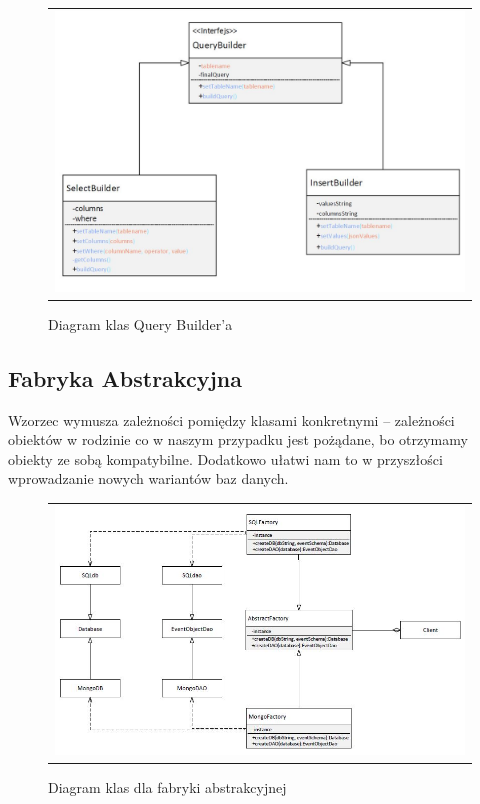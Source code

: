 \documentclass{sprawozdanie-agh}
\begin{document}
	\begin{figure}[H] 
		\centering
		\begin{tabular}{c}
			\includegraphics[width=.99\textwidth]{querybuilder}
		\end{tabular} 
		\caption{Diagram klas Query Builder'a}
	\end{figure}
	
	\subsection{Fabryka Abstrakcyjna}
	
	Wzorzec wymusza zależności pomiędzy klasami konkretnymi – zależności obiektów w rodzinie co w naszym przypadku jest pożądane, bo otrzymamy obiekty ze sobą kompatybilne. Dodatkowo ułatwi nam to w przyszłości wprowadzanie nowych wariantów baz danych.
	
	\begin{figure}[H] 
		\centering
		\begin{tabular}{c}
			\includegraphics[width=.95\textwidth]{factory}
		\end{tabular} 
		\caption{Diagram klas dla fabryki abstrakcyjnej}
	\end{figure}
	
\end{document}
